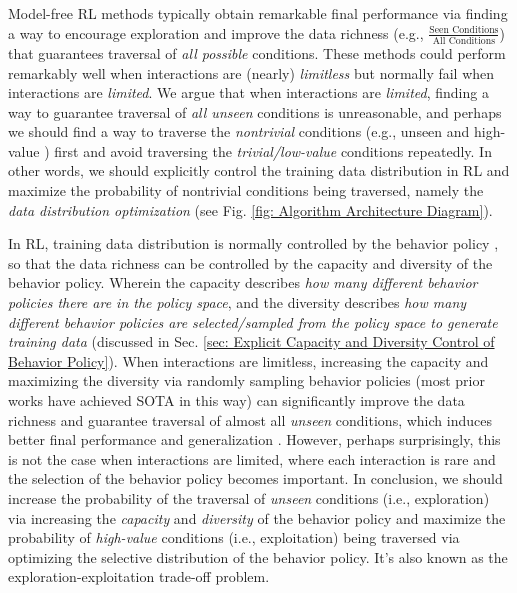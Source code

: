 Model-free RL methods typically obtain remarkable final performance via finding a way to encourage exploration and  improve the data richness (e.g., $\frac{\text{Seen Conditions}}{\text{All Conditions}}$) that guarantees traversal of \emph{all possible} conditions. These methods \citep{goexplore,agent57} could perform remarkably well when interactions are (nearly) \emph{limitless} but normally fail when  interactions are \emph{limited}. We argue that when interactions are \emph{limited}, finding a way to guarantee traversal of \emph{all unseen} conditions is unreasonable, and perhaps we should find a way to traverse the \emph{nontrivial} conditions (e.g., unseen \citep{goexplore} and high-value \citep{discor}) first and avoid traversing the \emph{trivial/low-value} conditions repeatedly. In other words, we should explicitly control the training data distribution in RL and maximize the probability of nontrivial conditions being traversed, namely the \emph{data distribution optimization} (see Fig. \ref{fig: Algorithm Architecture Diagram}). 


 In RL, training data distribution is normally controlled by the behavior policy \citep{sutton,dqn}, so that the data richness can be controlled by the capacity and diversity  of the behavior policy. Wherein the capacity describes \emph{how many different behavior policies there are in the policy space}, and the diversity describes \emph{how many different behavior policies are  selected/sampled from the policy space to generate training data} (discussed in Sec. \ref{sec: Explicit  Capacity and Diversity  Control of Behavior Policy}). When interactions are limitless, increasing the capacity and maximizing the diversity  via randomly sampling behavior policies (most prior works have achieved SOTA in this way) can significantly improve the data richness and guarantee traversal of almost all \emph{unseen} conditions, which induces better final performance \citep{agent57} and generalization  \citep{ghosh2021generalization}. However, perhaps surprisingly, this is not the case when interactions are limited, where each interaction is rare and the selection of the behavior policy becomes important. In conclusion, we should increase the probability of the traversal of \emph{unseen} conditions (i.e., exploration) via increasing the \emph{capacity} and \emph{diversity} of the behavior policy  and maximize the probability of  \emph{high-value} conditions (i.e., exploitation) being traversed via optimizing the selective distribution of the behavior policy. It's also known as  the  exploration-exploitation trade-off problem. 
 
